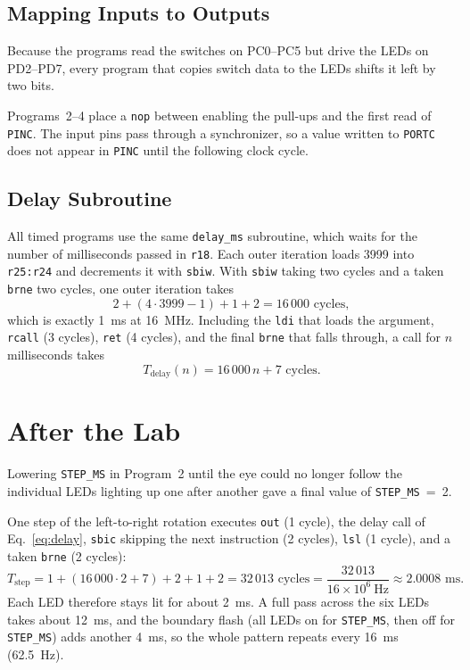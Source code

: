 \documentclass[11pt]{article}
\begin{document}
\subsection{Mapping Inputs to Outputs}
Because the programs read the switches on PC0--PC5 but drive the LEDs on PD2--PD7, every program that copies switch data to the LEDs shifts it left by two bits.

Programs~2--4 place a \texttt{nop} between enabling the pull-ups and the first read of \texttt{PINC}. The input pins pass through a synchronizer, so a value written to \texttt{PORTC} does not appear in \texttt{PINC} until the following clock cycle.

\subsection{Delay Subroutine}
All timed programs use the same \texttt{delay\_ms} subroutine, which waits for the number of milliseconds passed in \texttt{r18}. Each outer iteration loads 3999 into \texttt{r25:r24} and decrements it with \texttt{sbiw}. With \texttt{sbiw} taking two cycles and a taken \texttt{brne} two cycles, one outer iteration takes
\begin{equation}
  2 + (4 \cdot 3999 - 1) + 1 + 2 = 16\,000 \text{ cycles},
\end{equation}
which is exactly 1~ms at 16~MHz. Including the \texttt{ldi} that loads the argument, \texttt{rcall} (3 cycles), \texttt{ret} (4 cycles), and the final \texttt{brne} that falls through, a call for $n$ milliseconds takes
\begin{equation}
  T_{\text{delay}}(n) = 16\,000\,n + 7 \text{ cycles}.
  \label{eq:delay}
\end{equation}

\section{After the Lab}
Lowering \texttt{STEP\_MS} in Program~2 until the eye could no longer follow the individual LEDs lighting up one after another gave a final value of \texttt{STEP\_MS}~=~2.

One step of the left-to-right rotation executes \texttt{out} (1 cycle), the delay call of Eq.~\eqref{eq:delay}, \texttt{sbic} skipping the next instruction (2 cycles), \texttt{lsl} (1 cycle), and a taken \texttt{brne} (2 cycles):
\begin{equation}
  T_{\text{step}} = 1 + (16\,000 \cdot 2 + 7) + 2 + 1 + 2 = 32\,013 \text{ cycles} = \frac{32\,013}{16 \times 10^{6}\ \text{Hz}} \approx 2.0008 \text{ ms}.
\end{equation}
Each LED therefore stays lit for about 2~ms. A full pass across the six LEDs takes about 12~ms, and the boundary flash (all LEDs on for \texttt{STEP\_MS}, then off for \texttt{STEP\_MS}) adds another 4~ms, so the whole pattern repeats every 16~ms (62.5~Hz).
\end{document}
